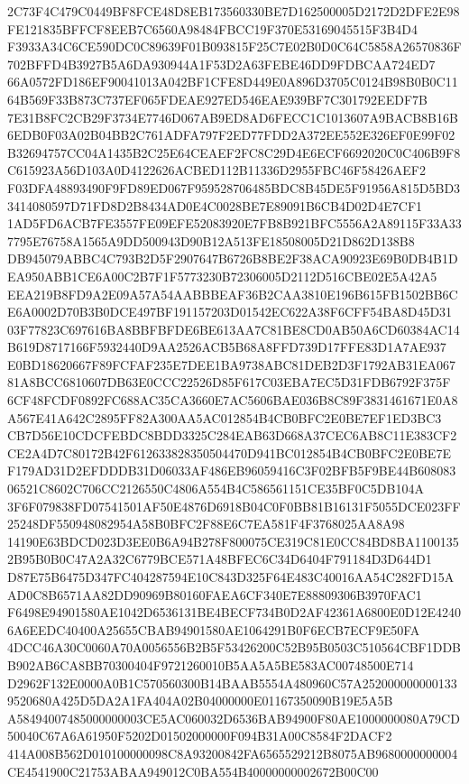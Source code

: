 \documentclass[UTF8,fontset=fandol,zihao=-4,a4paper]{ctexart}
\begin{document}
{{2C73F4C479C0449BF8FCE48D8EB173560330BE7D162500005D2172D2DFE2E98FE121835BFFCF8EEB7C6560A98484FBCC19F370E53169045515F3B4D4
F3933A34C6CE590DC0C89639F01B093815F25C7E02B0D0C64C5858A26570836F702BFFD4B3927B5A6DA930944A1F53D2A63FEBE46DD9FDBCAA724ED7
66A0572FD186EF90041013A042BF1CFE8D449E0A896D3705C0124B98B0B0C1164B569F33B873C737EF065FDEAE927ED546EAE939BF7C301792EEDF7B
7E31B8FC2CB29F3734E7746D067AB9ED8AD6FECC1C1013607A9BACB8B16B6EDB0F03A02B04BB2C761ADFA797F2ED77FDD2A372EE552E326EF0E99F02
B32694757CC04A1435B2C25E64CEAEF2FC8C29D4E6ECF6692020C0C406B9F8C615923A56D103A0D4122626ACBED112B11336D2955FBC46F58426AEF2
F03DFA48893490F9FD89ED067F959528706485BDC8B45DE5F91956A815D5BD33414080597D71FD8D2B8434AD0E4C0028BE7E89091B6CB4D02D4E7CF1
1AD5FD6ACB7FE3557FE09EFE52083920E7FB8B921BFC5556A2A89115F33A337795E76758A1565A9DD500943D90B12A513FE18508005D21D862D138B8
DB945079ABBC4C793B2D5F2907647B6726B8BE2F38ACA90923E69B0DB4B1DEA950ABB1CE6A00C2B7F1F5773230B72306005D2112D516CBE02E5A42A5
EEA219B8FD9A2E09A57A54AABBBEAF36B2CAA3810E196B615FB1502BB6CE6A0002D70B3B0DCE497BF191157203D01542EC622A38F6CFF54BA8D45D31
03F77823C697616BA8BBFBFDE6BE613AA7C81BE8CD0AB50A6CD60384AC14B619D8717166F5932440D9AA2526ACB5B68A8FFD739D17FFE83D1A7AE937
E0BD18620667F89FCFAF235E7DEE1BA9738ABC81DEB2D3F1792AB31EA06781A8BCC6810607DB63E0CCC22526D85F617C03EBA7EC5D31FDB6792F375F
6CF48FCDF0892FC688AC35CA3660E7AC5606BAE036B8C89F3831461671E0A8A567E41A642C2895FF82A300AA5AC012854B4CB0BFC2E0BE7EF1ED3BC3
CB7D56E10CDCFEBDC8BDD3325C284EAB63D668A37CEC6AB8C11E383CF2CE2A4D7C80172B42F612633828350504470D941BC012854B4CB0BFC2E0BE7E
F179AD31D2EFDDDB31D06033AF486EB96059416C3F02BFB5F9BE44B60808306521C8602C706CC2126550C4806A554B4C586561151CE35BF0C5DB104A
3F6F079838FD07541501AF50E4876D6918B04C0F0BB81B16131F5055DCE023FF25248DF550948082954A58B0BFC2F88E6C7EA581F4F3768025AA8A98
14190E63BDCD023D3EE0B6A94B278F800075CE319C81E0CC84BD8BA11001352B95B0B0C47A2A32C6779BCE571A48BFEC6C34D6404F791184D3D644D1
D87E75B6475D347FC404287594E10C843D325F64E483C40016AA54C282FD15AAD0C8B6571AA82DD90969B80160FAEA6CF340E7E88809306B3970FAC1
F6498E94901580AE1042D6536131BE4BECF734B0D2AF42361A6800E0D12E42406A6EEDC40400A25655CBAB94901580AE1064291B0F6ECB7ECF9E50FA
4DCC46A30C0060A70A0056556B2B5F53426200C52B95B0503C510564CBF1DDBB902AB6CA8BB70300404F9721260010B5AA5A5BE583AC00748500E714
D2962F132E0000A0B1C570560300B14BAAB5554A480960C57A2520000000001339520680A425D5DA2A1FA404A02B04000000E01167350090B19E5A5B
A58494007485000000003CE5AC060032D6536BAB94900F80AE1000000080A79CD50040C67A6A61950F5202D01502000000F094B31A00C8584F2DACF2
414A008B562D010100000098C8A93200842FA6565529212B8075AB9680000000004CE4541900C21753ABAA949012C0BA554B40000000002672B00C00
}}
\end{document}
